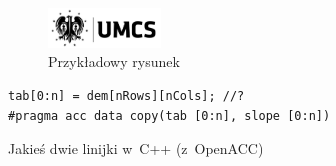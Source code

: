 \begin{figure}[b]
    \begin{center}
        \includegraphics[width=3cm]{LogoUMCS}
    \end{center}
    \caption{Przykładowy rysunek}\label{rys:przyk}
\end{figure}


\begin{lstfloat}[b]
    \lstset{language=C++}
    \begin{lstlisting}[frame=single]
tab[0:n] = dem[nRows][nCols]; //?
#pragma acc data copy(tab [0:n], slope [0:n])
\end{lstlisting}
    \caption{Jakieś dwie linijki w~C++ (z~OpenACC)}\label{lst:przyk}
\end{lstfloat}
\


